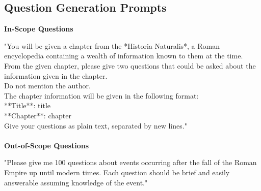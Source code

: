 \documentclass[sigconf]{aamas}
\begin{document}
\subsection{Question Generation Prompts}
\label{appendix:AutoPrompts}

\textbf{In-Scope Questions}

"You will be given a chapter from the *Historia Naturalis*, a Roman encyclopedia containing a wealth of information known to them at the time.
From the given chapter, please give two questions that could be asked about the information given in the chapter.\\
Do not mention the author.\\
The chapter information will be given in the following format:\\
**Title**: {title}\\
**Chapter**: {chapter}\\
Give your questions as plain text, separated by new lines."\\\\
\textbf{Out-of-Scope Questions}

"Please give me 100 questions about events occurring after the fall of the Roman Empire up until modern times. Each question should be brief and easily answerable assuming knowledge of the event."
\end{document}
